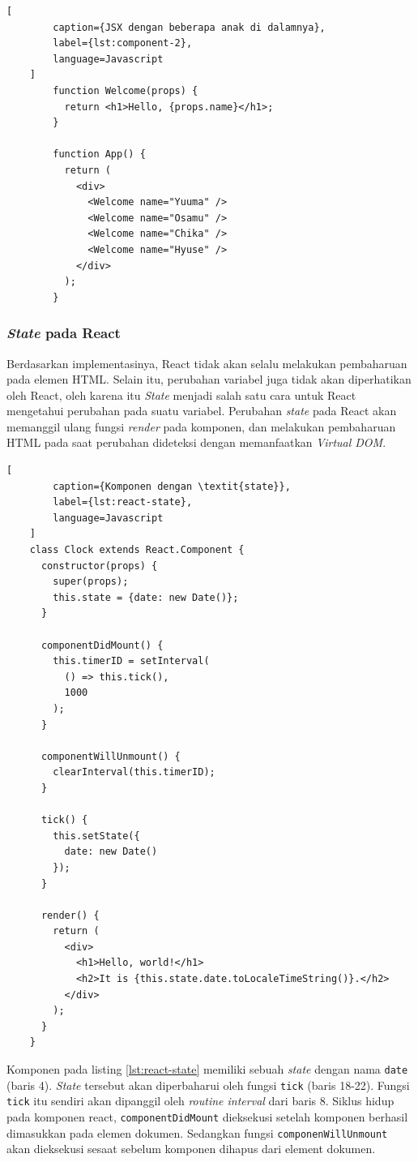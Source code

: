     \begin{lstlisting}[
        caption={JSX dengan beberapa anak di dalamnya}, 
        label={lst:component-2}, 
        language=Javascript
    ]
        function Welcome(props) {
          return <h1>Hello, {props.name}</h1>;
        }
        
        function App() {
          return (
            <div>
              <Welcome name="Yuuma" />
              <Welcome name="Osamu" />
              <Welcome name="Chika" />
              <Welcome name="Hyuse" />
            </div>
          );
        }
    \end{lstlisting}
    
    
    \subsubsection{\textit{State} pada React}
    Berdasarkan implementasinya, React tidak akan selalu melakukan pembaharuan pada elemen HTML. Selain itu, perubahan variabel juga tidak akan diperhatikan oleh React, oleh karena itu \textit{State} menjadi salah satu cara untuk React mengetahui perubahan pada suatu variabel.
    Perubahan \textit{state} pada React akan memanggil ulang fungsi \textit{render} pada komponen, dan melakukan pembaharuan HTML pada saat perubahan dideteksi dengan memanfaatkan \textit{Virtual DOM}.
    
    \begin{lstlisting}[
        caption={Komponen dengan \textit{state}}, 
        label={lst:react-state}, 
        language=Javascript
    ]
    class Clock extends React.Component {
      constructor(props) {
        super(props);
        this.state = {date: new Date()};
      }
    
      componentDidMount() {
        this.timerID = setInterval(
          () => this.tick(),
          1000
        );
      }
    
      componentWillUnmount() {
        clearInterval(this.timerID);
      }
    
      tick() {
        this.setState({
          date: new Date()
        });
      }
    
      render() {
        return (
          <div>
            <h1>Hello, world!</h1>
            <h2>It is {this.state.date.toLocaleTimeString()}.</h2>
          </div>
        );
      }
    }
    \end{lstlisting}
    
    Komponen pada listing \ref{lst:react-state} memiliki sebuah \textit{state} dengan nama \texttt{date} (baris 4). \textit{State} tersebut akan diperbaharui oleh fungsi \texttt{tick} (baris 18-22). Fungsi \texttt{tick} itu sendiri akan dipanggil oleh \textit{routine interval} dari baris 8. Siklus hidup pada komponen react, \texttt{componentDidMount} dieksekusi setelah komponen berhasil dimasukkan pada elemen dokumen. Sedangkan fungsi \texttt{componenWillUnmount} akan dieksekusi sesaat sebelum komponen dihapus dari element dokumen.
    
